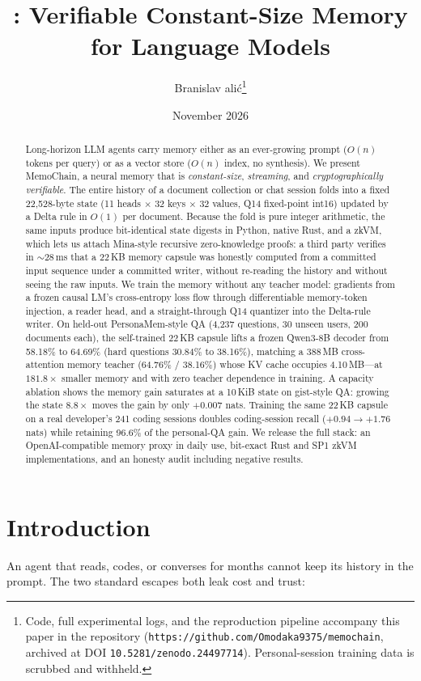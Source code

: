 \documentclass[11pt]{article}
\title{\method{}: Verifiable Constant-Size Memory for Language Models}
\author{%
  Branislav \DJ{}ali\'c\thanks{Code, full experimental logs, and the reproduction
  pipeline accompany this paper in the repository (\texttt{https://github.com/Omodaka9375/memochain},
  archived at DOI \texttt{10.5281/zenodo.24497714}).
  Personal-session training data is scrubbed and withheld.}\\
}
\date{November 2026}
\newcommand{\statebytes}{22{,}528}
\newcommand{\method}{MemoChain}
\begin{document}
\maketitle

\begin{abstract}
Long-horizon LLM agents carry memory either as an ever-growing prompt
($O(n)$ tokens per query) or as a vector store ($O(n)$ index, no synthesis).
We present \method{}, a neural memory that is \emph{constant-size},
\emph{streaming}, and \emph{cryptographically verifiable}. The entire
history of a document collection or chat session folds into a fixed
\statebytes-byte state (11 heads $\times$ 32 keys $\times$ 32 values, Q14
fixed-point int16) updated by a Delta rule in $O(1)$ per document. Because
the fold is pure integer arithmetic, the same inputs produce
bit-identical state digests in Python, native Rust, and a zkVM, which
lets us attach Mina-style recursive zero-knowledge proofs: a third party
verifies in ${\sim}28$\,ms that a 22\,KB memory capsule was honestly
computed from a committed input sequence under a committed writer,
without re-reading the history and without seeing the raw inputs. We
train the memory without any teacher model: gradients from a frozen
causal LM's cross-entropy loss flow through differentiable
memory-token injection, a reader head, and a straight-through Q14
quantizer into the Delta-rule writer. On held-out PersonaMem-style QA
(4{,}237 questions, 30 unseen users, 200 documents each), the
self-trained 22\,KB capsule lifts a frozen Qwen3-8B decoder from 58.18\%
to 64.69\% (hard questions 30.84\% to 38.16\%), matching a 388\,MB
cross-attention memory teacher (64.76\% / 38.16\%) whose KV cache
occupies 4.10\,MB---at $181.8\times$ smaller memory and with zero
teacher dependence in training. A capacity ablation shows the memory
gain saturates at a 10\,KiB state on gist-style QA: growing the state
$8.8\times$ moves the gain by only $+0.007$ nats. Training the same
22\,KB capsule on a real developer's 241 coding sessions doubles
coding-session recall ($+0.94 \to +1.76$ nats) while retaining 96.6\%
of the personal-QA gain. We release the full stack: an
OpenAI-compatible memory proxy in daily use, bit-exact Rust and SP1
zkVM implementations, and an honesty audit including negative results.
\end{abstract}

\section{Introduction}
An agent that reads, codes, or converses for months cannot keep its
history in the prompt. The two standard escapes both leak cost and
trust:
\end{document}
